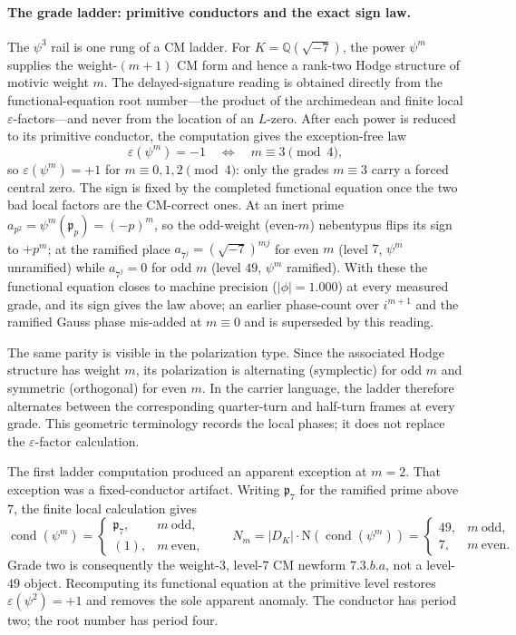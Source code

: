 \documentclass[11pt]{article}
\theoremstyle{definition}
\theoremstyle{remark}
\begin{document}
\paragraph{The grade ladder: primitive conductors and the exact sign law.}
The $\psi^3$ rail is one rung of a CM ladder.  For
$K=\mathbb Q(\sqrt{-7})$, the power $\psi^m$ supplies the weight-$(m+1)$
CM form and hence a rank-two Hodge structure of motivic weight $m$.  The
delayed-signature reading is obtained directly from the functional-equation
root number---the product of the archimedean and finite local
$\varepsilon$-factors---and never from the location of an $L$-zero.  After
each power is reduced to its primitive conductor, the computation gives the
exception-free law
\[
\varepsilon(\psi^m)=-1
\quad\Longleftrightarrow\quad
m\equiv3\pmod4,
\]
so $\varepsilon(\psi^m)=+1$ for $m\equiv0,1,2\pmod4$: only the grades
$m\equiv3$ carry a forced central zero.  The sign is fixed by the completed
functional equation once the two bad local factors are the CM-correct
ones.  At an inert prime $a_{p^2}=\psi^m(\mathfrak p_p)=(-p)^m$, so the
odd-weight (even-$m$) nebentypus flips its sign to $+p^m$; at the ramified
place $a_{7^j}=(\sqrt{-7})^{mj}$ for even $m$ (level $7$, $\psi^m$
unramified) while $a_{7^j}=0$ for odd $m$ (level $49$, $\psi^m$ ramified).
With these the functional equation closes to machine precision
($|\phi|=1.000$) at every measured grade, and its sign gives the law above;
an earlier phase-count over $i^{m+1}$ and the ramified Gauss phase
mis-added at $m\equiv0$ and is superseded by this reading.

The same parity is visible in the polarization type.  Since the associated
Hodge structure has weight $m$, its polarization is alternating
(symplectic) for odd $m$ and symmetric (orthogonal) for even $m$.  In the
carrier language, the ladder therefore alternates between the corresponding
quarter-turn and half-turn frames at every grade.  This geometric
terminology records the local phases; it does not replace the
$\varepsilon$-factor calculation.

The first ladder computation produced an apparent exception at $m=2$.
That exception was a fixed-conductor artifact.  Writing $\mathfrak p_7$ for
the ramified prime above $7$, the finite local calculation gives
\[
\operatorname{cond}(\psi^m)=
\begin{cases}
\mathfrak p_7,&m\ \text{odd},\\
(1),&m\ \text{even},
\end{cases}
\qquad
N_m=|D_K|\cdot\mathrm N\!\left(\operatorname{cond}(\psi^m)\right)=
\begin{cases}
49,&m\ \text{odd},\\
7,&m\ \text{even}.
\end{cases}
\]
Grade two is consequently the weight-$3$, level-$7$ CM newform
$7.3.b.a$, not a level-$49$ object.  Recomputing its functional equation at
the primitive level restores $\varepsilon(\psi^2)=+1$ and removes the sole
apparent anomaly.  The conductor has period two; the root number has period
four.
\end{document}
